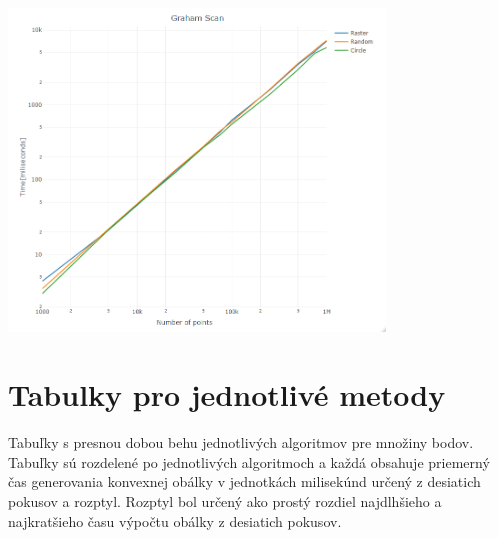 \documentclass[12pt]{article}
\begin{document}
\begin{center}
   \includegraphics[width=10cm]{./img/plot_graham_scan.png}
\end{center}

\section{Tabulky pro jednotlivé metody}
Tabuľky s presnou dobou behu jednotlivých algoritmov pre množiny bodov. Tabuľky sú rozdelené po jednotlivých algoritmoch a každá obsahuje priemerný čas generovania konvexnej obálky v jednotkách milisekúnd určený z desiatich pokusov a rozptyl. Rozptyl bol určený ako prostý rozdiel najdlhšieho a najkratšieho času výpočtu obálky z desiatich pokusov.
\end{document}
